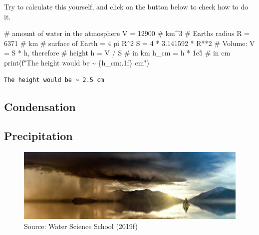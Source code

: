 \documentclass[
  letterpaper,
  DIV=11,
  numbers=noendperiod]{scrreprt}
\newenvironment{Shaded}{\begin{snugshade}}{\end{snugshade}}
\newcommand{\BuiltInTok}[1]{\textcolor[rgb]{0.00,0.23,0.31}{#1}}
\newcommand{\CommentTok}[1]{\textcolor[rgb]{0.37,0.37,0.37}{#1}}
\newcommand{\DecValTok}[1]{\textcolor[rgb]{0.68,0.00,0.00}{#1}}
\newcommand{\FloatTok}[1]{\textcolor[rgb]{0.68,0.00,0.00}{#1}}
\newcommand{\NormalTok}[1]{\textcolor[rgb]{0.00,0.23,0.31}{#1}}
\newcommand{\OperatorTok}[1]{\textcolor[rgb]{0.37,0.37,0.37}{#1}}
\newcommand{\SpecialCharTok}[1]{\textcolor[rgb]{0.37,0.37,0.37}{#1}}
\newcommand{\SpecialStringTok}[1]{\textcolor[rgb]{0.13,0.47,0.30}{#1}}
\begin{document}
Try to calculate this yourself, and click on the button below to check
how to do it.

\begin{Shaded}
\begin{Highlighting}[]
\CommentTok{\# amount of water in the atmosphere}
\NormalTok{V }\OperatorTok{=} \DecValTok{12900} \CommentTok{\# km\^{}3}
\CommentTok{\# Earth\textquotesingle{}s radius}
\NormalTok{R }\OperatorTok{=} \DecValTok{6371} \CommentTok{\# km}
\CommentTok{\# surface of Earth = 4 pi Rˆ2}
\NormalTok{S }\OperatorTok{=} \DecValTok{4} \OperatorTok{*} \FloatTok{3.141592} \OperatorTok{*}\NormalTok{ R}\OperatorTok{**}\DecValTok{2}
\CommentTok{\# Volume: V = S * h, therefore}
\CommentTok{\# height}
\NormalTok{h }\OperatorTok{=}\NormalTok{ V }\OperatorTok{/}\NormalTok{ S }\CommentTok{\# in km}
\NormalTok{h\_cm }\OperatorTok{=}\NormalTok{ h }\OperatorTok{*} \FloatTok{1e5} \CommentTok{\# in cm}
\BuiltInTok{print}\NormalTok{(}\SpecialStringTok{f"The height would be \textasciitilde{} }\SpecialCharTok{\{}\NormalTok{h\_cm}\SpecialCharTok{:.1f\}}\SpecialStringTok{ cm"}\NormalTok{)}
\end{Highlighting}
\end{Shaded}

\begin{verbatim}
The height would be ~ 2.5 cm
\end{verbatim}

\hypertarget{condensation}{%
\subsection{Condensation}\label{condensation}}

\hypertarget{precipitation}{%
\subsection{Precipitation}\label{precipitation}}

\begin{figure}

{\centering \includegraphics{archive/figures/rain-burst1.jpg}

}

\caption{Source: Water Science School (2019f)}

\end{figure}
\end{document}
